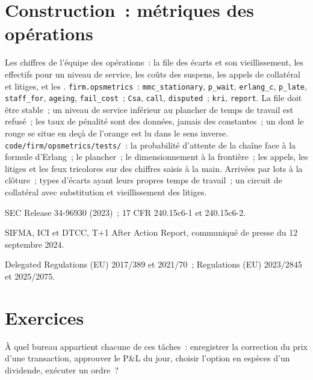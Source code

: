 \section{Construction~: métriques des opérations}\label{bld:fm:operations:opsmetrics}

\begin{build}
 Les chiffres de l'équipe des opérations~: la file des écarts et son vieillissement, les effectifs pour un niveau de service, les coûts des suspens, les appels de collatéral et
litiges, et les .
 \texttt{firm.opsmetrics}~: \texttt{mmc\_stationary}, \texttt{p\_wait}, \texttt{erlang\_c}, \texttt{p\_late}, \texttt{staff\_for},
\texttt{ageing}, \texttt{fail\_cost}~; \texttt{Csa}, \texttt{call}, \texttt{disputed}~; \texttt{kri}, \texttt{report}.
 La file doit être stable~; un niveau de service inférieur au plancher de temps de travail est refusé~; les taux de pénalité sont des données, jamais des constantes~; un  dont le rouge se situe en deçà de l'orange est lu dans le sens inverse.
 \texttt{code/firm/opsmetrics/tests/}~: la probabilité d'attente de la chaîne face à la formule d'Erlang~; le plancher~; le dimensionnement à
la frontière~; les appels, les litiges et les feux tricolores sur des chiffres saisis à la main.
 Arrivées par lots à la clôture~; types d'écarts ayant leurs propres temps de travail~; un circuit de collatéral avec substitution et vieillissement des
litiges.
\end{build}

\begin{omsources}
\item SEC Release 34-96930 (2023)~; 17 CFR 240.15c6-1 et 240.15c6-2.
\item SIFMA, ICI et DTCC, T+1 After Action Report, communiqué de presse du 12 septembre 2024.
\item Delegated Regulations (EU) 2017/389 et 2021/70~; Regulations (EU) 2023/2845 et 2025/2075.
\end{omsources}

\section{Exercices}

\begin{exercise}[$\star$]\label{exo:fm:operations:1}
À quel bureau appartient chacune de ces tâches~: enregistrer la correction du prix d'une transaction, approuver le P\&L du jour, choisir
l'option en espèces d'un dividende, exécuter un ordre~?
\end{exercise}

